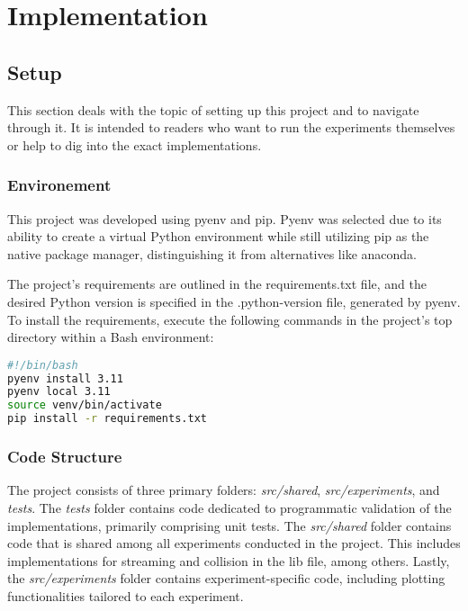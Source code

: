 \chapter{Implementation}


\section{Setup}
This section deals with the topic of setting up this project and to navigate through it.
It is intended to readers who want to run the experiments themselves or help to dig into the exact implementations.

\subsection{Environement}
This project was developed using pyenv and pip.
Pyenv was selected due to its ability to create a virtual Python environment while still utilizing pip as the native package manager, distinguishing it from alternatives like anaconda.
\newline

The project's requirements are outlined in the requirements.txt file, and the desired Python version is specified in the .python-version file, generated by pyenv.
To install the requirements, execute the following commands in the project's top directory within a Bash environment:

\begin{center}
    \begin{lstlisting}[language=bash]
#!/bin/bash
pyenv install 3.11
pyenv local 3.11
source venv/bin/activate
pip install -r requirements.txt
    \end{lstlisting}
\end{center}

\subsection{Code Structure}
The project consists of three primary folders: \textit{src/shared}, \textit{src/experiments}, and \textit{tests}.
The \textit{tests} folder contains code dedicated to programmatic validation of the implementations, primarily comprising unit tests.
The \textit{src/shared} folder contains code that is shared among all experiments conducted in the project.
This includes implementations for streaming and collision in the lib file, among others.
Lastly, the \textit{src/experiments} folder contains experiment-specific code, including plotting functionalities tailored to each experiment.


